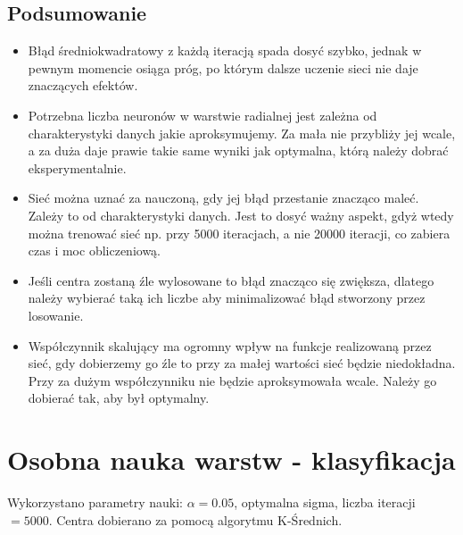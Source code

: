 \documentclass[a4paper, portrait,11pt]{article}
\begin{document}
\subsection{Podsumowanie}
\begin{itemize}
  \item Błąd średniokwadratowy z każdą iteracją spada dosyć szybko, jednak w pewnym momencie osiąga próg, po którym dalsze uczenie sieci nie daje znaczących efektów.
  \item Potrzebna liczba neuronów w warstwie radialnej jest zależna od charakterystyki danych jakie aproksymujemy. Za mała nie przybliży jej wcale, a za duża daje prawie takie same wyniki jak optymalna, którą należy dobrać eksperymentalnie.
  \item Sieć można uznać za nauczoną, gdy jej błąd przestanie znacząco maleć. Zależy to od charakterystyki danych. Jest to dosyć ważny aspekt, gdyż wtedy można trenować sieć np. przy 5000 iteracjach, a nie 20000 iteracji, co zabiera czas i moc obliczeniową.
  \item Jeśli centra zostaną źle wylosowane to błąd znacząco się zwiększa, dlatego należy wybierać taką ich liczbe aby minimalizować błąd stworzony przez losowanie.
  \item Współczynnik skalujący ma ogromny wpływ na funkcje realizowaną przez sieć, gdy dobierzemy go źle to przy za małej wartości sieć będzie niedokładna. Przy za dużym współczynniku nie będzie aproksymowała wcale. Należy go dobierać tak, aby był optymalny.
\end{itemize}

\section{Osobna nauka warstw - klasyfikacja}
Wykorzystano parametry nauki: $\alpha=0.05$, optymalna sigma, liczba iteracji $=5000$.
Centra dobierano za pomocą algorytmu K-Średnich.
\end{document}
